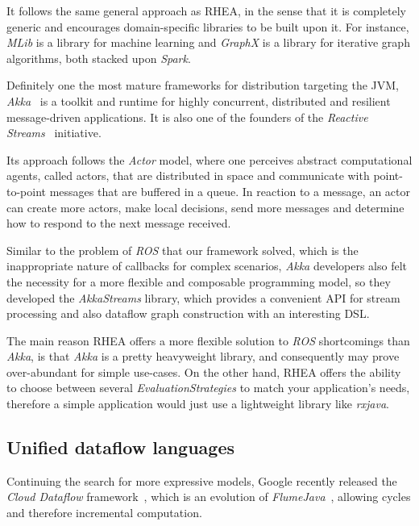 \documentclass[sigplan,review,anonymous,screen]{acmart}
\begin{document}
It follows the same general approach as \textsc{RHEA}, in the sense that it is
completely generic and encourages domain-specific libraries to be built upon it.
For instance, \textit{MLib} is a library for machine learning and
\textit{GraphX} is a library for iterative graph algorithms, both stacked upon
\textit{Spark}.

Definitely one the most mature frameworks for distribution targeting the JVM,
\textit{Akka}~\cite{akka} is a toolkit and runtime for highly
concurrent, distributed and resilient message-driven applications. It is also
one of the founders of the \textit{Reactive Streams}~\cite{rss} initiative.

Its approach follows the \textit{Actor} model, where one perceives
abstract computational agents, called actors, that are distributed in space and
communicate with point-to-point messages that are buffered in a queue. In
reaction to a message, an actor can create more actors, make local decisions,
send more messages and determine how to respond to the next message received.

Similar to the problem of \textit{ROS} that our framework solved, which is the
inappropriate nature of callbacks for complex scenarios, \textit{Akka}
developers also felt the necessity for a more flexible and composable
programming model, so they developed the \textit{AkkaStreams} library, which
provides a convenient API for stream processing and also dataflow graph
construction with an interesting DSL.

The main reason \textsc{RHEA} offers a more flexible solution to \textit{ROS}
shortcomings than \textit{Akka}, is that \textit{Akka} is a pretty heavyweight
library, and consequently may prove over-abundant for simple use-cases. On the
other hand, \textsc{RHEA} offers the ability to choose between several
\textit{EvaluationStrategies} to match your application's needs, therefore a
simple application would just use a lightweight library like \textit{rxjava}.

\subsection{Unified dataflow languages}
Continuing the search for more expressive models, Google recently released the
\textit{Cloud Dataflow} framework~\cite{googledataflow},
which is an evolution of \textit{FlumeJava}~\cite{flumejava}, allowing cycles and
therefore incremental computation.
\end{document}
